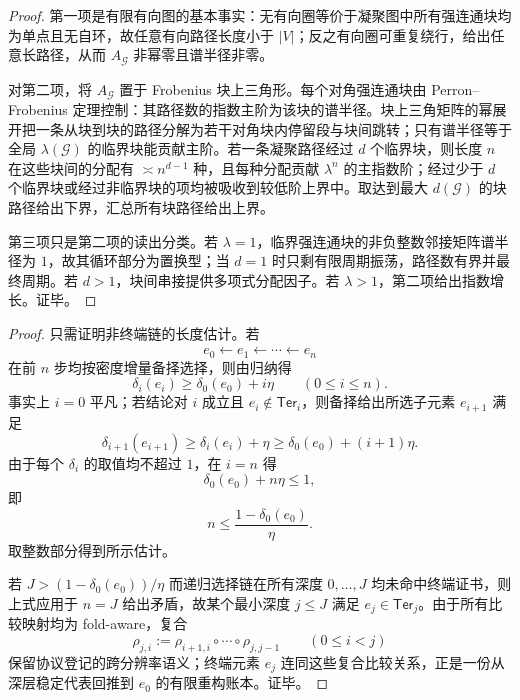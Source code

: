 \begin{proof}
第一项是有限有向图的基本事实：无有向圈等价于凝聚图中所有强连通块均为单点且无自环，故任意有向路径长度小于 \(|V|\)；反之有向圈可重复绕行，给出任意长路径，从而 \(A_{\mathcal G}\) 非幂零且谱半径非零。

对第二项，将 \(A_{\mathcal G}\) 置于 Frobenius 块上三角形。每个对角强连通块由 Perron--Frobenius 定理控制：其路径数的指数主阶为该块的谱半径。块上三角矩阵的幂展开把一条从块到块的路径分解为若干对角块内停留段与块间跳转；只有谱半径等于全局 \(\lambda(\mathcal G)\) 的临界块能贡献主阶。若一条凝聚路径经过 \(d\) 个临界块，则长度 \(n\) 在这些块间的分配有 \(\asymp n^{d-1}\) 种，且每种分配贡献 \(\lambda^n\) 的主指数阶；经过少于 \(d\) 个临界块或经过非临界块的项均被吸收到较低阶上界中。取达到最大 \(d(\mathcal G)\) 的块路径给出下界，汇总所有块路径给出上界。

第三项只是第二项的读出分类。若 \(\lambda=1\)，临界强连通块的非负整数邻接矩阵谱半径为 \(1\)，故其循环部分为置换型；当 \(d=1\) 时只剩有限周期振荡，路径数有界并最终周期。若 \(d>1\)，块间串接提供多项式分配因子。若 \(\lambda>1\)，第二项给出指数增长。证毕。
\end{proof}

\begin{proof}
只需证明非终端链的长度估计。若
\[
e_0\xleftarrow{}e_1\xleftarrow{}\cdots\xleftarrow{}e_n
\]
在前 \(n\) 步均按密度增量备择选择，则由归纳得
\[
\delta_i(e_i)\ge \delta_0(e_0)+i\eta
\qquad(0\le i\le n).
\]
事实上 \(i=0\) 平凡；若结论对 \(i\) 成立且 \(e_i\notin\mathsf{Ter}_i\)，则备择给出所选子元素 \(e_{i+1}\) 满足
\[
\delta_{i+1}(e_{i+1})
\ge \delta_i(e_i)+\eta
\ge \delta_0(e_0)+(i+1)\eta.
\]
由于每个 \(\delta_i\) 的取值均不超过 \(1\)，在 \(i=n\) 得
\[
\delta_0(e_0)+n\eta\le 1,
\]
即
\[
n\le \frac{1-\delta_0(e_0)}{\eta}.
\]
取整数部分得到所示估计。

若 \(J>(1-\delta_0(e_0))/\eta\) 而递归选择链在所有深度 \(0,
\ldots,J\) 均未命中终端证书，则上式应用于 \(n=J\) 给出矛盾，故某个最小深度 \(j\le J\) 满足 \(e_j\in\mathsf{Ter}_j\)。由于所有比较映射均为 fold-aware，复合
\[
\rho_{j,i}:=\rho_{i+1,i}\circ\cdots\circ\rho_{j,j-1}
\qquad(0\le i<j)
\]
保留协议登记的跨分辨率语义；终端元素 \(e_j\) 连同这些复合比较关系，正是一份从深层稳定代表回推到 \(e_0\) 的有限重构账本。证毕。
\end{proof}


